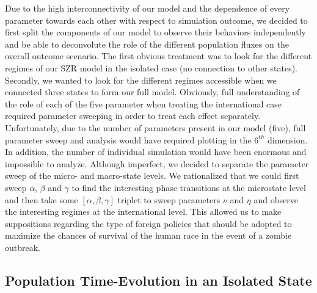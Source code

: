 \documentclass[11pt]{article} %
\begin{document}
Due to the high interconnectivity of our model and the dependence of every parameter towards each other with respect to simulation outcome, we decided to first split the components of our model to observe their behaviors independently and be able to deconvolute the role of the different population fluxes on the overall outcome scenario. The first obvious treatment was to look for the different regimes of our SZR model in the isolated case (no connection to other states). Secondly, we wanted to look for the different regimes accessible when we connected three states to form our full model. Obviously, full understanding of the role of each of the five parameter when treating the international case required parameter sweeping in order to treat each effect separately. Unfortunately, due to the number of parameters present in our model (five), full parameter sweep and analysis would have required plotting in the $6^{th}$ dimension. In addition, the number of individual simulation would have been enormous and impossible to analyze. Although imperfect, we decided to separate the parameter sweep of the micro- and macro-state levels. We rationalized that we could first sweep $\alpha$, $\beta$ and $\gamma$  to find the interesting phase transitions at the microstate level and then take some $[\alpha, \beta, \gamma]$ triplet to sweep parameters $\nu$ and $\eta$ and observe the interesting regimes at the international level. This allowed us to make suppositions regarding the type of foreign policies that should be adopted to maximize the chances of survival of the human race in the event of a zombie outbreak. 

\subsection{Population Time-Evolution in an Isolated State}\indent
\label{szr}
\end{document}
